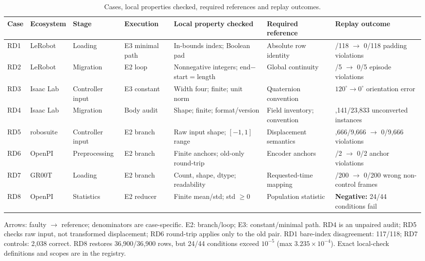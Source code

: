 \begin{table}[t]
\centering
\footnotesize
\caption{Cases, local properties checked, required references and replay outcomes.}
\label{tab:cases}
\renewcommand{\arraystretch}{1.10}
\setlength{\tabcolsep}{1.5pt}
\begin{tabular}{@{}>{\raggedright\arraybackslash}p{0.58cm}>{\raggedright\arraybackslash}p{1.53cm}>{\raggedright\arraybackslash}p{1.65cm}>{\raggedright\arraybackslash}p{1.46cm}>{\raggedright\arraybackslash}p{3.2cm}>{\raggedright\arraybackslash}p{2.64cm}>{\raggedright\arraybackslash}p{5.12cm}@{}}
\toprule
\textbf{Case} & \textbf{Ecosystem} & \textbf{Stage} & \textbf{Execution} & \textbf{Local property checked} & \textbf{Required reference} & \textbf{Replay outcome} \\
\midrule
RD1 & LeRobot~\cite{2} & Loading & E3 minimal path & In-bounds index; Boolean pad & Absolute row identity & 118/118 $\rightarrow$ 0/118 padding violations \\
RD2 & LeRobot~\cite{4} & Migration & E2 loop & Nonnegative integers; end$-$start$=$length & Global continuity & 1/5 $\rightarrow$ 0/5 episode violations \\
RD3 & Isaac Lab~\cite{1} & Controller input & E3 constant & Width four; finite; unit norm & Quaternion convention & $120^{\circ} \to 0^{\circ}$ orientation error \\
RD4 & Isaac Lab~\cite{3} & Migration & Body audit & Shape; finite; format/version & Field inventory; convention & 15,141/23,833 unconverted instances \\
RD5 & robosuite~\cite{5} & Controller input & E2 branch & Raw input shape; $[-1,1]$ range & Displacement semantics & 9,666/9,666 $\rightarrow$ 0/9,666 violations \\
RD6 & OpenPI~\cite{6} & Preprocessing & E2 branch & Finite anchors; old-only round-trip & Encoder anchors & 2/2 $\rightarrow$ 0/2 anchor violations \\
RD7 & GR00T~\cite{7} & Loading & E2 branch & Count, shape, dtype; readability & Requested-time mapping & 200/200 $\rightarrow$ 0/200 wrong non-control frames \\
RD8 & OpenPI~\cite{8} & Statistics & E2 reducer & Finite mean/std; std $\geq0$ & Population statistic & \textbf{Negative:} 24/44 conditions fail \\
\bottomrule
\end{tabular}
\par\vspace{3pt}
\begin{minipage}{\textwidth}\footnotesize
Arrows: faulty $\to$ reference; denominators are case-specific. E2: branch/loop; E3: constant/minimal path. RD4 is an unpaired audit; RD5 checks raw input, not transformed displacement; RD6 round-trip applies only to the old pair. RD1 bare-index disagreement: 117/118; RD7 controls: 2,038 correct. RD8 restores 36,900/36,900 rows, but 24/44 conditions exceed $10^{-5}$ (max $ 3.235\times10^{-4}$). Exact local-check definitions and scopes are in the registry.
\end{minipage}
\end{table}

